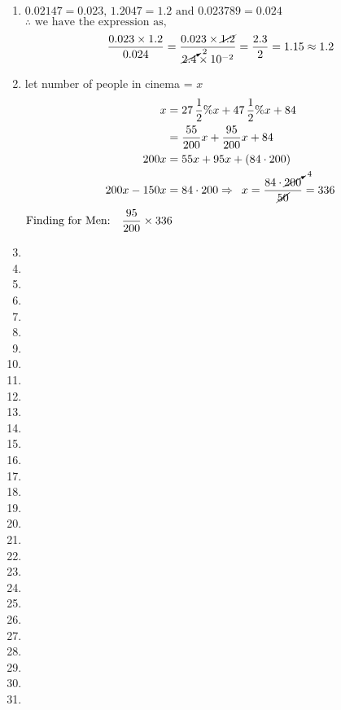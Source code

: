 \begin{multicols}{2}
\begin{enumerate}[label={\textbf{\arabic*.}}]
\begin{enumerate}[label={\arabic*.}]
    \item $0.02147 = 0.023, \, 1.2047 = 1.2 \text{ and } 0.023789 = 0.024$ \\
    \(\therefore \text{ we have the expression as, } \) \\
    \[\dfrac{0.023 \times 1.2}{0.024} = \dfrac{0.023 \times \cancel{1.2}}{\cancelto{2}{2.4} \times 10^{-2}} = \dfrac{2.3}{2} = 1.15 \approx 1.2\] 
    \item let number of people in cinema = $x$ 
    \begin{align*}
    x &= 27\,\dfrac{1}{2}\%x + 47\,\dfrac{1}{2}\%x + 84  \\
    &= \dfrac{55}{200}x + \dfrac{95}{200}x + 84 \\
     200x &= 55x + 95x + (84 \cdot 200) \\
     200x - 150x &= 84 \cdot 200 
    \Rightarrow \hspace{5px} x = \dfrac{84 \cdot \cancelto{4}{200}}{\cancel{50}}  = 336 
    \end{align*}
    $\text{Finding for Men:} \hspace{10px} \dfrac{95}{200} \times 336$
    \item
    \item
    \item 
    \item
    \item
    \item 
    \item 
    \item 
    \item 
    \item
    \item
    \item
    \item 
    \item
    \item
    \item 
    \item 
    \item 
    \item 
    \item
    \item
    \item
    \item 
    \item
    \item
    \item 
    \item 
    \item 
    \item 

\end{enumerate}
\end{enumerate}
\end{multicols}
